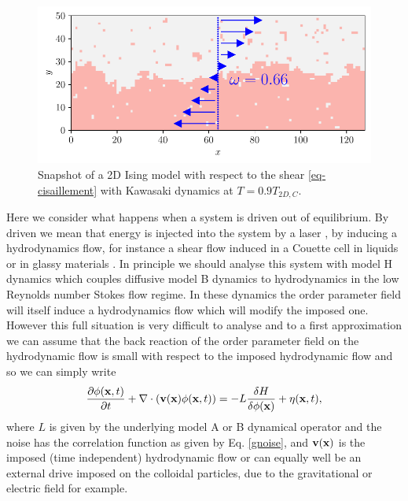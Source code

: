 \begin{figure}
\begin{minipage}[t]{0.5\linewidth}
\end{minipage}
\centering
\begin{minipage}[t]{0.5\linewidth}
\includegraphics[width=\linewidth]{intro/cis-ising-f-066.pdf}
\end{minipage}
\caption{Snapshot of a 2D Ising model with respect to the shear \eqref{eq-cisaillement} with Kawasaki dynamics at $T=0.9 T_{2D,C}$.}
\label{snap-ising-shear} 
\end{figure} 

Here we consider what happens when a system is driven out of equilibrium. By driven we mean that energy is injected into the system by a laser \cite{girot_conical_2019}, by inducing a hydrodynamics flow, for instance a shear flow induced in a Couette cell in liquids \cite{derks_confocal_2004,derks_suppression_2006} or in glassy materials \cite{berthier_nonequilibrium_2002,berthier_shearing_2002}. In principle we should analyse this system with model H dynamics which couples diffusive model B dynamics to hydrodynamics in the low Reynolds number Stokes flow regime. In these dynamics the order parameter field will itself induce a hydrodynamics flow which will modify
the imposed one. However this full situation is very difficult to analyse and to a first approximation we can assume that the back reaction of the order parameter field on the hydrodynamic flow is small with respect to the imposed hydrodynamic flow and so we can simply write
\begin{equation}
\frac{\partial \phi ({\bf x},t)}{\partial t} + \nabla\cdot({\bf v}({\bf x})\phi({\bf x},t)) =- L\frac{\delta H}{\delta \phi({\bf x})} + \eta({\bf x},t),
\label{drive}
\end{equation}
where $L$ is given by the underlying model A or B dynamical operator and the noise has the correlation function as given by Eq. \eqref{gnoise}, and ${\bf v}({\bf x})$ is the imposed (time independent) hydrodynamic flow or can equally well be an external drive imposed on the colloidal particles, due to the gravitational or electric field for example. 

